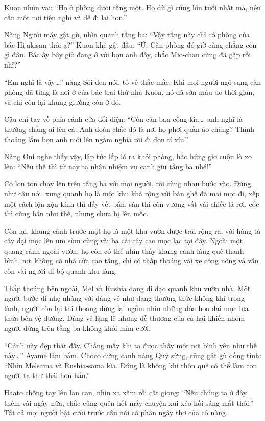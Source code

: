 \documentclass[../main.tex]{subfiles}
\begin{document}
Kuon nhún vai: ``Họ ở phòng dưới tầng một. Họ dù gì cũng lớn tuổi nhất mà, nên cần một nơi tiện nghi và dễ đi lại hơn.''

Nàng Người máy gật gù, nhìn quanh tầng ba: ``Vậy tầng này chỉ có phòng của bác Hijakisan thôi ạ?'' Kuon khẽ gật đầu: ``Ừ. Căn phòng đó giờ cũng chẳng còn gì đâu. Bác ấy bây giờ đang ở với bọn anh đấy, chắc Mio-chan cũng đã gặp rồi nhỉ?''

``Em nghĩ là vậy\dots'' nàng Sói đen nói, tỏ vẻ thắc mắc. Khi mọi người ngó sang căn phòng đã từng là nơi ở của bác trai thứ nhà Kuon, nó đã sờn màu do thời gian, và chỉ còn lại khung giường còn ở đó.

Cậu chỉ tay về phía cánh cửa đối diện: ``Còn căn ban công kia\dots\ anh nghĩ là thường chẳng ai lên cả. Anh đoán chắc đó là nơi họ phơi quần áo chăng? Thỉnh thoảng lắm bọn anh mới lên ngắm nghía rồi đi dọn tí xíu.''

Nàng Oni nghe thấy vậy, lập tức lấp ló ra khỏi phòng, hào hứng giơ cuộn lò xo lên: ``Nếu thế thì từ nay ta nhận nhiệm vụ canh giữ tầng ba nhé!''

Cô lon ton chạy lên trên tầng ba với mọi người, rồi cùng nhau bước vào. Đúng như cậu nói, xung quanh họ là một khu khá rộng với bàn ghế đã mai mọt đi, xếp một cách lộn xộn kính thì đầy vết bẩn, sàn thì còn vương vất vài chiếc lá rơi, cốc thì cũng bẩn như thế, nhưng chưa bị lên mốc.

Còn lại, khung cảnh trước mặt họ là một khu vườn được trải rộng ra, với hàng tá cây dại mọc lên um sùm cùng vài ba cái cây cao mọc lạc tại đây. Ngoài một quang cảnh ngoài vườn, họ còn có thể nhìn thấy khung cảnh làng quê thanh bình, nơi không có nhà cửa cao tầng, chỉ có thấp thoáng vài xe công nông và vẫn còn vài người đi bộ quanh khu làng.

Thấp thoáng bên ngoài, Mel và Rushia đang đi dạo quanh khu vườn nhà. Một người bước đi nhẹ nhàng với dáng vẻ như đang thưởng thức không khí trong lành, người còn lại thi thoảng dừng lại ngắm nhìn những đóa hoa dại mọc lưa thưa bên vệ đường. Dáng vẻ lặng lẽ nhưng dễ thương của cả hai khiến nhóm người đứng trên tầng ba không khỏi mỉm cười.

``Cảnh này đẹp thật đấy. Chẳng mấy khi ta được thấy một nơi bình yên như thế này\dots'' Ayame lẩm bẩm. Choco đứng cạnh nàng Quỷ sừng, cũng gật gù đồng tình: ``Nhìn Melsama và Rushia-sama kìa. Đúng là không khí thôn quê có thể làm con người ta thư thái hơn hẳn.''

Haato chống tay lên lan can, nhìn xa xăm rồi cất giọng: ``Nếu chúng ta ở đây thêm vài ngày nữa, chắc cũng quên hết mấy chuyện xui xẻo hồi sáng mất thôi.'' Tất cả mọi người bật cười trước câu nói có phần ngây thơ của cô nàng.
\end{document}
